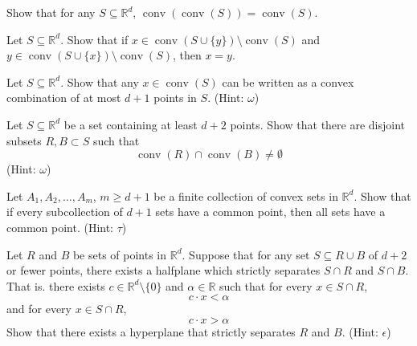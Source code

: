 \documentclass{article}
\DeclareMathOperator{\conv}{conv}
\begin{document}
\begin{exercise}

Show that for any $S\subseteq\mathbb{R}^d$, $\conv(\conv(S))=\conv(S)$.

\end{exercise}



\begin{exercise}

Let $S\subseteq\mathbb{R}^d$. Show that if $x\in\conv(S\cup\{y\})\setminus \conv(S)$ and $y\in\conv(S\cup\{x\})\setminus \conv(S)$, then $x=y$.

\end{exercise}



\begin{exercise}

Let $S\subseteq\mathbb{R}^d$. Show that any $x\in\conv(S)$ can be written as a convex combination of at most $d+1$ points in $S$. (Hint: $\omega$)

\end{exercise}



\begin{exercise}

Let $S\subseteq\mathbb{R}^d$ be a set containing at least $d+2$ points. Show that there are disjoint subsets $R,B\subset S$ such that 
\[\conv(R)\cap \conv(B)\ne \emptyset\]
(Hint: $\omega$)

\end{exercise}



\begin{exercise}

Let $A_1,A_2,\ldots,A_m$, $m\ge d+1$ be a finite collection of convex sets in $\mathbb{R}^d$. Show that if every subcollection of $d+1$ sets have a common point, then all sets have a common point. (Hint: $\tau$)

\end{exercise}



\iffalse

\begin{exercise}

Let $R$ and $B$ be sets of points in $\mathbb{R}^d$. Suppose that for any set $S\subseteq R\cup B$ of $d+2$ or fewer points, there exists a halfplane which strictly separates $S\cap R$ and $S\cap B$. That is. there exists $c\in\mathbb{R}^d\setminus\{0\}$ and $\alpha\in\mathbb{R}$ such that for every $x\in S\cap R$,
\[c\cdot x<\alpha\]
and for every $x\in S\cap R$,
\[c\cdot x>\alpha\]
Show that there exists a hyperplane that strictly separates $R$ and $B$. (Hint: $\epsilon$)

\end{exercise}
\end{document}

